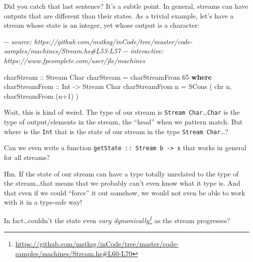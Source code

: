 \documentclass[]{article}
\newenvironment{Shaded}{}{}
\newcommand{\CommentTok}[1]{\textcolor[rgb]{0.38,0.63,0.69}{\textit{#1}}}
\newcommand{\DataTypeTok}[1]{\textcolor[rgb]{0.56,0.13,0.00}{#1}}
\newcommand{\DecValTok}[1]{\textcolor[rgb]{0.25,0.63,0.44}{#1}}
\newcommand{\FunctionTok}[1]{\textcolor[rgb]{0.02,0.16,0.49}{#1}}
\newcommand{\KeywordTok}[1]{\textcolor[rgb]{0.00,0.44,0.13}{\textbf{#1}}}
\newcommand{\NormalTok}[1]{#1}
\newcommand{\OperatorTok}[1]{\textcolor[rgb]{0.40,0.40,0.40}{#1}}
\newcommand{\OtherTok}[1]{\textcolor[rgb]{0.00,0.44,0.13}{#1}}
\newcommand{\StringTok}[1]{\textcolor[rgb]{0.25,0.44,0.63}{#1}}
\renewcommand{\href}[2]{#2\footnote{\url{#1}}}
\begin{document}
Did you catch that last sentence? It's a subtle point. In general, streams can
have outputs that are different than their states. As a trivial example, let's
have a stream whose state is an integer, yet whose output is a character:

\begin{Shaded}
\begin{Highlighting}[]
\CommentTok{{-}{-} source: https://github.com/mstksg/inCode/tree/master/code{-}samples/machines/Stream.hs\#L53{-}L57}
\CommentTok{{-}{-} interactive: https://www.fpcomplete.com/user/jle/machines}

\OtherTok{charStream ::} \DataTypeTok{Stream} \DataTypeTok{Char}
\NormalTok{charStream }\OtherTok{=}\NormalTok{ charStreamFrom }\DecValTok{65}
  \KeywordTok{where}
\OtherTok{    charStreamFrom ::} \DataTypeTok{Int} \OtherTok{{-}\textgreater{}} \DataTypeTok{Stream} \DataTypeTok{Char}
\NormalTok{    charStreamFrom n }\OtherTok{=} \DataTypeTok{SCons}\NormalTok{ ( }\FunctionTok{chr}\NormalTok{ n, charStreamFrom (n}\OperatorTok{+}\DecValTok{1}\NormalTok{) )}
\end{Highlighting}
\end{Shaded}

\begin{Shaded}
\end{Shaded}

Wait, this is kind of weird. The type of our stream is
\texttt{Stream\ Char}\ldots{}\texttt{Char} is the type of output/elements in the
stream, the ``head'' when we pattern match. But where is the \texttt{Int} that
is the state of our stream in the type \texttt{Stream\ Char}\ldots?

Can we even write a function
\texttt{getState\ ::\ Stream\ b\ -\textgreater{}\ s} that works in general for
all streams?

Hm. If the state of our stream can have a type totally unrelated to the type of
the stream\ldots that means that we probably can't even know what it type is.
And that even if we could ``force'' it out somehow, we would not even be able to
work with it in a type-safe way!

In fact\ldots couldn't the state even
\emph{\href{https://github.com/mstksg/inCode/tree/master/code-samples/machines/Stream.hs\#L60-L70}{vary
dynamically}} as the stream progresses?
\end{document}
